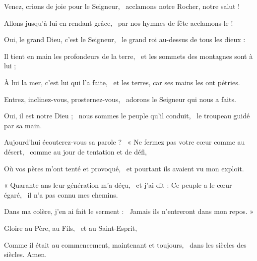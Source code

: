 \item Venez, crions de joie pour le Seigneur,~\psstar{} acclamons notre Rocher, notre salut !
\item Allons jusqu'à lui en rendant grâce,~\psstar{} par nos hymnes de fête acclamons-le ! 
\item Oui, le grand Dieu, c'est le Seigneur,~\psstar{} le grand roi au-dessus de tous les dieux :
\item Il tient en main les profondeurs de la terre,~\psstar{} et les sommets des montagnes sont à lui ; 
\item À lui la mer, c'est lui qui l'a faite,~\psstar{} et les terres, car ses mains les ont pétries.
\item Entrez, inclinez-vous, prosternez-vous,~\psstar{} adorons le Seigneur qui nous a faits.
\item Oui, il est notre Dieu ;~\pscross{} nous sommes le peuple qu'il conduit,~\psstar{} le troupeau guidé par sa main. 
\item Aujourd'hui écouterez-vous sa parole ?~\pscross{} « Ne fermez pas votre cœur comme au désert,~\psstar{} comme au jour de tentation et de défi,
\item Où vos pères m'ont tenté et provoqué,~\psstar{} et pourtant ils avaient vu mon exploit. 
\item « Quarante ans leur génération m'a déçu,~\pscross{} et j'ai dit : Ce peuple a le cœur égaré,~\psstar{} il n'a pas connu mes chemins.
\item Dans ma colère, j'en ai fait le serment :~\psstar{} Jamais ils n'entreront dans mon repos. » 
\item Gloire au Père, au Fils,~\psstar{} et au Saint-Esprit,
\item Comme il était au commencement, maintenant et toujours,~\psstar{} dans les siècles des siècles. Amen. 
